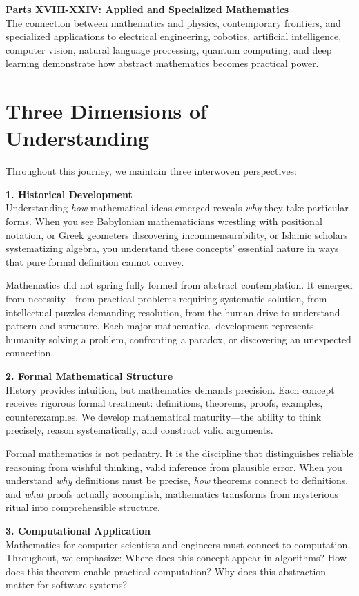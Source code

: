 \textbf{Parts XVIII-XXIV: Applied and Specialized Mathematics}\\
The connection between mathematics and physics, contemporary frontiers, and specialized applications to electrical engineering, robotics, artificial intelligence, computer vision, natural language processing, quantum computing, and deep learning demonstrate how abstract mathematics becomes practical power.

\section*{Three Dimensions of Understanding}

Throughout this journey, we maintain three interwoven perspectives:

\textbf{1. Historical Development}\\
Understanding \textit{how} mathematical ideas emerged reveals \textit{why} they take particular forms. When you see Babylonian mathematicians wrestling with positional notation, or Greek geometers discovering incommensurability, or Islamic scholars systematizing algebra, you understand these concepts' essential nature in ways that pure formal definition cannot convey.

Mathematics did not spring fully formed from abstract contemplation. It emerged from necessity—from practical problems requiring systematic solution, from intellectual puzzles demanding resolution, from the human drive to understand pattern and structure. Each major mathematical development represents humanity solving a problem, confronting a paradox, or discovering an unexpected connection.

\textbf{2. Formal Mathematical Structure}\\
History provides intuition, but mathematics demands precision. Each concept receives rigorous formal treatment: definitions, theorems, proofs, examples, counterexamples. We develop mathematical maturity—the ability to think precisely, reason systematically, and construct valid arguments.

Formal mathematics is not pedantry. It is the discipline that distinguishes reliable reasoning from wishful thinking, valid inference from plausible error. When you understand \textit{why} definitions must be precise, \textit{how} theorems connect to definitions, and \textit{what} proofs actually accomplish, mathematics transforms from mysterious ritual into comprehensible structure.

\textbf{3. Computational Application}\\
Mathematics for computer scientists and engineers must connect to computation. Throughout, we emphasize: Where does this concept appear in algorithms? How does this theorem enable practical computation? Why does this abstraction matter for software systems?

